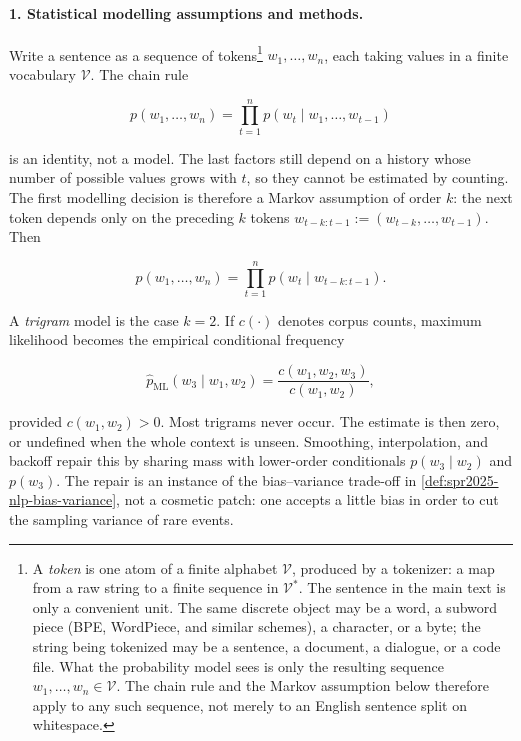 \documentclass[11pt,a4paper]{article}
\theoremstyle{definition}
\begin{document}
\paragraph{1. Statistical modelling assumptions and methods.}
Write a sentence as a sequence of tokens\footnote{A \emph{token} is one atom of a finite alphabet \(\mathcal{V}\), produced by a tokenizer: a map from a raw string to a finite sequence in \(\mathcal{V}^*\). The sentence in the main text is only a convenient unit. The same discrete object may be a word, a subword piece (BPE, WordPiece, and similar schemes), a character, or a byte; the string being tokenized may be a sentence, a document, a dialogue, or a code file. What the probability model sees is only the resulting sequence \(w_1,\ldots,w_n\in\mathcal{V}\). The chain rule and the Markov assumption below therefore apply to any such sequence, not merely to an English sentence split on whitespace.} \(w_1,\ldots,w_n\), each taking values in a finite vocabulary \(\mathcal{V}\). The chain rule

\[
p(w_1,\ldots,w_n)
=\prod_{t=1}^{n} p(w_t\mid w_1,\ldots,w_{t-1})
\]

is an identity, not a model. The last factors still depend on a history whose number of possible values grows with \(t\), so they cannot be estimated by counting. The first modelling decision is therefore a Markov assumption of order \(k\): the next token depends only on the preceding \(k\) tokens \(w_{t-k:t-1}:=(w_{t-k},\ldots,w_{t-1})\). Then

\[
p(w_1,\ldots,w_n)
=\prod_{t=1}^{n} p(w_t\mid w_{t-k:t-1}).
\]

A \emph{trigram} model is the case \(k=2\). If \(c(\cdot)\) denotes corpus counts, maximum likelihood becomes the empirical conditional frequency

\[
\widehat p_{\mathrm{ML}}(w_3\mid w_1,w_2)
=\frac{c(w_1,w_2,w_3)}{c(w_1,w_2)},
\]

provided \(c(w_1,w_2)>0\). Most trigrams never occur. The estimate is then zero, or undefined when the whole context is unseen. Smoothing, interpolation, and backoff repair this by sharing mass with lower-order conditionals \(p(w_3\mid w_2)\) and \(p(w_3)\). The repair is an instance of the bias--variance trade-off in \cref{def:spr2025-nlp-bias-variance}, not a cosmetic patch: one accepts a little bias in order to cut the sampling variance of rare events.
\end{document}
